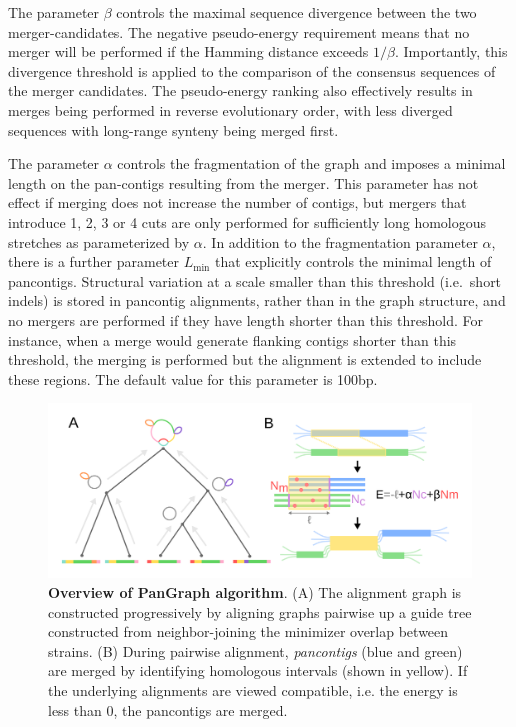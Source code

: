 \documentclass[aps,rmp,preprint,superscriptaddress,10pt,linenumbers]{revtex4-1}
\newcommand{\Lthr}{L_{\min}}
\begin{document}
The parameter $\beta$ controls the maximal sequence divergence between the two merger-candidates. The negative pseudo-energy requirement means that no merger will be performed if the Hamming distance exceeds $1/\beta$.
Importantly, this divergence threshold is applied to the comparison of the consensus sequences of the merger candidates.
The pseudo-energy ranking also effectively results in merges being performed in reverse evolutionary order, with less diverged sequences with long-range synteny being merged first.

The parameter $\alpha$ controls the fragmentation of the graph and imposes a minimal length on the pan-contigs resulting from the merger.
This parameter has not effect if merging does not increase the number of contigs, but mergers that introduce 1, 2, 3 or 4 cuts are only performed for sufficiently long homologous stretches as parameterized by $\alpha$.
In addition to the fragmentation parameter $\alpha$, there is a further parameter $\Lthr$ that explicitly controls the minimal length of pancontigs. Structural variation at a scale smaller than this threshold (i.e.~short indels) is stored in pancontig alignments, rather than in the graph structure, and no mergers are performed if they have length shorter than this threshold. For instance, when a merge would generate flanking contigs shorter than this threshold, the merging is performed but the alignment is extended to include these regions. 
The default value for this parameter is 100bp.


\begin{figure}[htb]
    \includegraphics[width=.45\textwidth]{figs/algorithm.pdf}
    \caption{{\bf Overview of PanGraph algorithm}.
        (A) The alignment graph is constructed progressively by aligning graphs pairwise up a guide tree constructed from neighbor-joining the minimizer overlap between strains.
        (B) During pairwise alignment, \emph{pancontigs} (blue and green)
        are merged by identifying homologous intervals (shown in yellow).
        If the underlying alignments are viewed compatible, i.e. the energy is less than 0, the pancontigs are merged.
    }
    \label{fig:visualization}
\end{figure}
\end{document}
